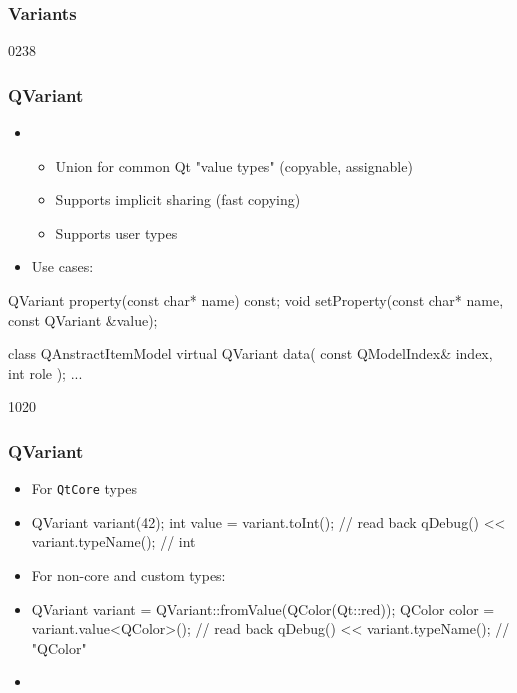 %
%
%
%

\subsubsection{Variants}

\begin{slide}[fragile]{0238}\frametitle{QVariant}
\begin{itemize}
  \item {} 
  \begin{itemize}
    \item Union for common Qt "value types" (copyable, assignable)
    \item Supports implicit sharing (fast copying)
    \item Supports user types
  \end{itemize}\medskip
\item Use cases:
\end{itemize}
\begin{cpp}
QVariant property(const char* name) const;
void setProperty(const char* name, const QVariant &value);
\end{cpp}\medskip

\begin{cpp}
class QAnstractItemModel {
  virtual QVariant data( const QModelIndex& index, int role );
  ...
}
\end{cpp}
\end{slide}

\begin{slide}[fragile]{1020}\frametitle{QVariant}
\begin{itemize}
  \item For \texttt{QtCore} types  
  \item[] \begin{cpp}
QVariant variant(42);
int value = variant.toInt(); // read back
qDebug() << variant.typeName(); // int
\end{cpp}\vspace*{3mm}
\item For non-core and custom types:
  \item[] \begin{cpp}
QVariant variant = QVariant::fromValue(QColor(Qt::red));
QColor color = variant.value<QColor>(); // read back
qDebug() << variant.typeName(); // "QColor"
\end{cpp}\vspace*{3mm}
\item[] 
\end{itemize}
\end{slide}

